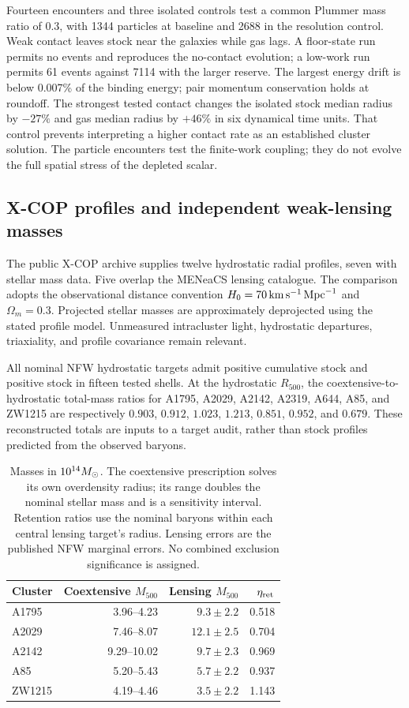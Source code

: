 Fourteen encounters and three isolated controls test a common Plummer
mass ratio of 0.3, with 1344 particles at baseline and 2688 in the
resolution control. Weak contact leaves stock near the galaxies while
gas lags. A floor-state run permits no events and reproduces the
no-contact evolution; a low-work run permits 61 events against 7114
with the larger reserve. The largest energy drift is below 0.007\%
of the binding energy; pair momentum conservation holds at roundoff.
The strongest tested contact changes the isolated stock median radius
by $-27\%$ and gas median radius by $+46\%$ in six dynamical time units.
That control prevents interpreting a higher contact rate as an established
cluster solution. The particle encounters test the finite-work coupling;
they do not evolve the full spatial stress of the depleted scalar.

\subsection{X-COP profiles and independent weak-lensing masses}
The public X-COP archive supplies twelve hydrostatic radial profiles,
seven with stellar mass data. Five overlap the MENeaCS lensing catalogue.
The comparison adopts the observational distance convention
$H_0=70\,\mathrm{km\,s^{-1}}\,\mathrm{Mpc}^{-1}$ and $\Omega_m=0.3$.
Projected stellar masses are approximately deprojected using the stated
profile model. Unmeasured intracluster light, hydrostatic departures,
triaxiality, and profile covariance remain relevant.
\cite{xcopnew,herbonnetnew}

All nominal NFW hydrostatic targets admit positive cumulative stock and
positive stock in fifteen tested shells. At the hydrostatic $R_{500}$,
the coextensive-to-hydrostatic total-mass ratios for A1795, A2029, A2142,
A2319, A644, A85, and ZW1215 are respectively
$0.903$, $0.912$, $1.023$, $1.213$, $0.851$, $0.952$, and $0.679$.
These reconstructed totals are inputs to a target audit, rather than
stock profiles predicted from the observed baryons.

\begin{table}[H]
\centering\small
\begin{tabular}{lrrr}
\toprule
Cluster & Coextensive $M_{500}$ & Lensing $M_{500}$ & $\eta_{\rm ret}$\\
\midrule
A1795 & 3.96--4.23 & $9.3\pm2.2$ & 0.518\\
A2029 & 7.46--8.07 & $12.1\pm2.5$ & 0.704\\
A2142 & 9.29--10.02 & $9.7\pm2.3$ & 0.969\\
A85 & 5.20--5.43 & $5.7\pm2.2$ & 0.937\\
ZW1215 & 4.19--4.46 & $3.5\pm2.2$ & 1.143\\
\bottomrule
\end{tabular}
\caption{Masses in $10^{14}M_\odot$. The coextensive prescription solves
its own overdensity radius; its range doubles the nominal stellar mass
and is a sensitivity interval. Retention ratios use the nominal baryons
within each central lensing target's radius. Lensing errors are the
published NFW marginal errors. No combined exclusion significance is
assigned.}
\end{table}

